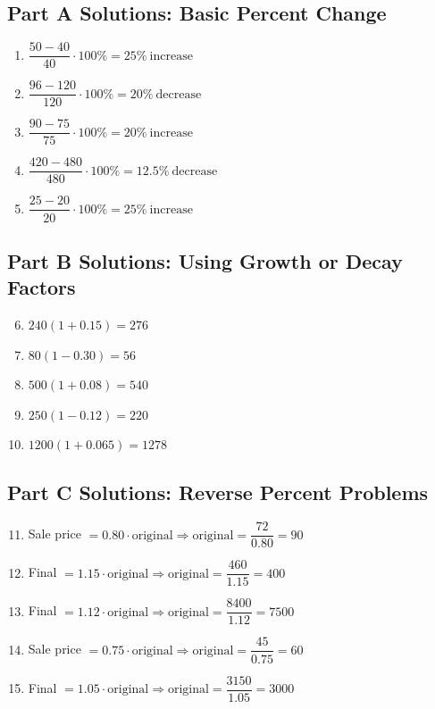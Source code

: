 \documentclass[14pt]{extarticle}
\begin{document}
\subsection*{Part A Solutions: Basic Percent Change}
\begin{enumerate}
  \item \(\dfrac{50-40}{40}\cdot100\% = \boxed{25\%\ \text{increase}}\)
  \item \(\dfrac{96-120}{120}\cdot100\% = \boxed{20\%\ \text{decrease}}\)
  \item \(\dfrac{90-75}{75}\cdot100\% = \boxed{20\%\ \text{increase}}\)
  \item \(\dfrac{420-480}{480}\cdot100\% = \boxed{12.5\%\ \text{decrease}}\)
  \item \(\dfrac{25-20}{20}\cdot100\% = \boxed{25\%\ \text{increase}}\)
\end{enumerate}

\subsection*{Part B Solutions: Using Growth or Decay Factors}
\begin{enumerate}
  \setcounter{enumi}{5}
  \item \(240(1+0.15)=\boxed{276}\)
  \item \(80(1-0.30)=\boxed{56}\)
  \item \(500(1+0.08)=\boxed{540}\)
  \item \(250(1-0.12)=\boxed{220}\)
  \item \(1200(1+0.065)=\boxed{1278}\)
\end{enumerate}

\subsection*{Part C Solutions: Reverse Percent Problems}
\begin{enumerate}
  \setcounter{enumi}{10}
  \item Sale price \(=0.80\cdot \text{original}\Rightarrow \text{original}=\dfrac{72}{0.80}=\boxed{90}\)
  \item Final \(=1.15\cdot \text{original}\Rightarrow \text{original}=\dfrac{460}{1.15}=\boxed{400}\)
  \item Final \(=1.12\cdot \text{original}\Rightarrow \text{original}=\dfrac{8400}{1.12}=\boxed{7500}\)
  \item Sale price \(=0.75\cdot \text{original}\Rightarrow \text{original}=\dfrac{45}{0.75}=\boxed{60}\)
  \item Final \(=1.05\cdot \text{original}\Rightarrow \text{original}=\dfrac{3150}{1.05}=\boxed{3000}\)
\end{enumerate}
\end{document}
